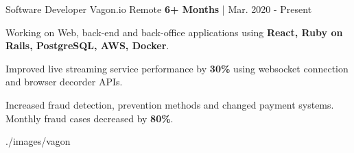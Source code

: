 
\begin{cventries}
\vspace{-5mm}
  \cventrywithimage
   {Software Developer
   } %
    {Vagon.io} %
    {Remote} %
    {\textbf{6+ Months} | Mar. 2020 - Present} %
    {
      \begin{cvitems} %
        \item {Working on Web, back-end and back-office applications using \textbf{ React, Ruby on Rails, PostgreSQL, AWS, Docker}.}
		\item {Improved live streaming service performance by \textbf{30\%} using websocket connection and browser decorder APIs.}
		\item {Increased fraud detection, prevention methods and changed payment systems. Monthly fraud cases decreased by \textbf{80\%}.}
      \end{cvitems}
    }
    {./images/vagon}



\end{cventries}
